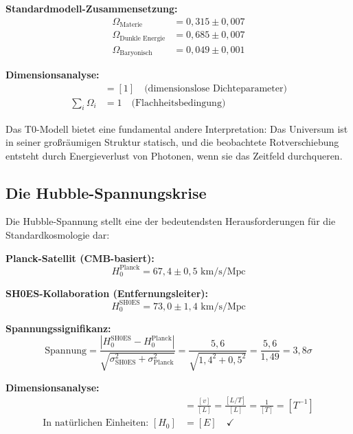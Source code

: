\documentclass[12pt,a4paper]{report}
\begin{document}
	\textbf{Standardmodell-Zusammensetzung:}
	\begin{align}
		\Omega_{\text{Materie}} &= 0,315 \pm 0,007 \\
		\Omega_{\text{Dunkle Energie}} &= 0,685 \pm 0,007 \\
		\Omega_{\text{Baryonisch}} &= 0,049 \pm 0,001
	\end{align}
	
	\textbf{Dimensionsanalyse:}
	\begin{align}
		[\Omega_i] &= [1] \quad \text{(dimensionslose Dichteparameter)} \\
		\sum_i \Omega_i &= 1 \quad \text{(Flachheitsbedingung)}
	\end{align}
	
	Das T0-Modell bietet eine fundamental andere Interpretation: Das Universum ist in seiner großräumigen Struktur statisch, und die beobachtete Rotverschiebung entsteht durch Energieverlust von Photonen, wenn sie das Zeitfeld durchqueren.
	
	\subsection{Die Hubble-Spannungskrise}
	\label{subsec:hubble_tension_crisis}
	
	Die Hubble-Spannung stellt eine der bedeutendsten Herausforderungen für die Standardkosmologie dar:
	
	\textbf{Planck-Satellit (CMB-basiert):}
	\begin{equation}
		H_0^{\text{Planck}} = 67,4 \pm 0,5 \text{ km/s/Mpc}
	\end{equation}
	
	\textbf{SH0ES-Kollaboration (Entfernungsleiter):}
	\begin{equation}
		H_0^{\text{SH0ES}} = 73,0 \pm 1,4 \text{ km/s/Mpc}
	\end{equation}
	
	\textbf{Spannungssignifikanz:}
	\begin{equation}
		\text{Spannung} = \frac{|H_0^{\text{SH0ES}} - H_0^{\text{Planck}}|}{\sqrt{\sigma_{\text{SH0ES}}^2 + \sigma_{\text{Planck}}^2}} = \frac{5,6}{\sqrt{1,4^2 + 0,5^2}} = \frac{5,6}{1,49} = 3,8\sigma
	\end{equation}
	
	\textbf{Dimensionsanalyse:}
	\begin{align}
		[H_0] &= \frac{[v]}{[L]} = \frac{[L/T]}{[L]} = \frac{1}{[T]} = [T^{-1}] \\
		\text{In natürlichen Einheiten: } [H_0] &= [E] \quad \checkmark
	\end{align}
	
\end{document}
